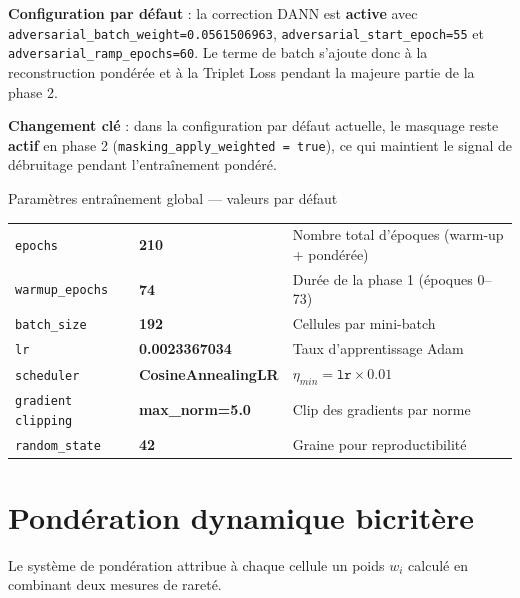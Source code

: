 \documentclass[11pt,a4paper]{article}
\begin{document}
\textbf{Configuration par d\'efaut} : la correction DANN est \textbf{active} avec \texttt{adversarial\_batch\_weight=0.0561506963}, \texttt{adversarial\_start\_epoch=55} et \texttt{adversarial\_ramp\_epochs=60}. Le terme de batch s'ajoute donc \`a la reconstruction pond\'er\'ee et \`a la Triplet Loss pendant la majeure partie de la phase 2.

\textbf{Changement cl\'e} : dans la configuration par d\'efaut actuelle, le masquage reste \textbf{actif} en phase 2 (\texttt{masking\_apply\_weighted = true}), ce qui maintient le signal de d\'ebruitage pendant l'entra\^inement pond\'er\'e.

\begin{parambox}{Param\`etres entra\^inement global --- valeurs par d\'efaut}
\begin{tabular}{lll}
\texttt{epochs} & \textbf{210} & Nombre total d'\'epoques (warm-up + pond\'er\'ee) \\
\texttt{warmup\_epochs} & \textbf{74} & Dur\'ee de la phase 1 (\'epoques 0--73) \\
\texttt{batch\_size} & \textbf{192} & Cellules par mini-batch \\
\texttt{lr} & \textbf{0.0023367034} & Taux d'apprentissage Adam \\
\texttt{scheduler} & \textbf{CosineAnnealingLR} & $\eta_{min} = \texttt{lr} \times 0.01$ \\
\texttt{gradient clipping} & \textbf{max\_norm=5.0} & Clip des gradients par norme \\
\texttt{random\_state} & \textbf{42} & Graine pour reproductibilit\'e \\
\end{tabular}
\end{parambox}

\section{Pond\'eration dynamique bicrit\`ere}
\label{sec:weighting}

Le syst\`eme de pond\'eration attribue \`a chaque cellule un poids $w_i$ calcul\'e en combinant deux mesures de raret\'e.
\end{document}
